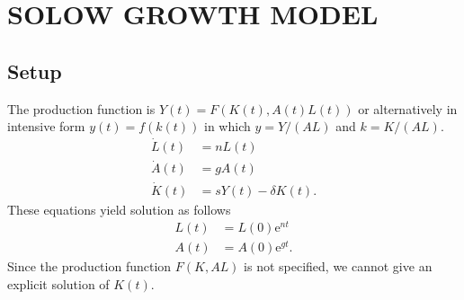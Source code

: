 \documentclass[12pt]{article} %
\newcommand{\e}{\mathrm{e}}
\begin{document}
\tableofcontents %

\newpage %


\section{SOLOW GROWTH MODEL} %



\subsection{Setup} %
The production function is $Y(t)=F(K(t),A(t)L(t))$ or alternatively in intensive form $y(t)=f(k(t))$ in which $y=Y/(AL)$ and $k=K/(AL)$.
\begin{align*}
	\dot{L}(t) & =nL(t) \\
	\dot{A}(t) & =gA(t) \\
	\dot{K}(t) & =sY(t)-\delta K(t).
\end{align*}
These equations yield solution as follows
\begin{align*}
L(t) & =L(0)\e^{nt} \\
A(t) & =A(0)\e^{gt} .
\end{align*}
Since the production function $F(K,AL)$ is not specified, we cannot give an explicit solution of $K(t)$. 
\end{document}
